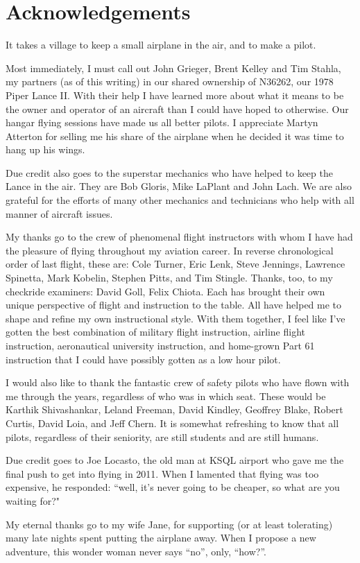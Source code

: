 \section*{Acknowledgements}

It takes a village to keep a small airplane in the air, and to make a pilot.

Most immediately, I must call out John Grieger, Brent Kelley and Tim Stahla, my partners (as of this writing) in our shared ownership of N36262, our 1978 Piper Lance II. With their help I have learned more about what it means to be the owner and operator of an aircraft than I could have hoped to otherwise. Our hangar flying sessions have made us all better pilots. I appreciate Martyn Atterton for selling me his share of the airplane when he decided it was time to hang up his wings.

Due credit also goes to the superstar mechanics who have helped to keep the Lance in the air. They are Bob Gloris, Mike LaPlant and John Lach. We are also grateful for the efforts of many other mechanics and technicians who help with all manner of aircraft issues.

My thanks go to the crew of phenomenal flight instructors with whom I have had the pleasure of flying throughout my aviation career. In reverse chronological order of last flight, these are: Cole Turner, Eric Lenk, Steve Jennings, Lawrence Spinetta, Mark Kobelin, Stephen Pitts, and Tim Stingle. Thanks, too, to my checkride examiners: David Goll, Felix Chiota. Each has brought their own unique perspective of flight and instruction to the table. All have helped me to shape and refine my own instructional style. With them together, I feel like I've gotten the best combination of military flight instruction, airline flight instruction, aeronautical university instruction, and home-grown Part 61 instruction that I could have possibly gotten as a low hour pilot.

I would also like to thank the fantastic crew of safety pilots who have flown with me through the years, regardless of who was in which seat. These would be Karthik Shivashankar, Leland Freeman, David Kindley, Geoffrey Blake, Robert Curtis, David Loia, and Jeff Chern. It is somewhat refreshing to know that all pilots, regardless of their seniority, are still students and are still humans.

Due credit goes to Joe Locasto, the old man at KSQL airport who gave me the final push to get into flying in 2011. When I lamented that flying was too expensive, he responded: ``well, it's never going to be cheaper, so what are you waiting for?"

My eternal thanks go to my wife Jane, for supporting (or at least tolerating) many late nights spent putting the airplane away. When I propose a new adventure, this wonder woman never says ``no'', only, ``how?''.


